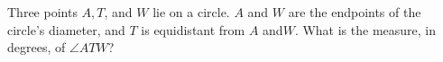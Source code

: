 Three points $A, T$, and $W$ lie on a circle. $A$ and $W$ are the endpoints of the circle's diameter, and $T$ is equidistant from $A$ and$ W$. What is the measure, in degrees, of $\angle ATW$?
